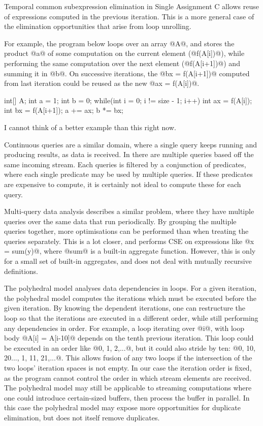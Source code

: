 Temporal common subexpression elimination in Single Assignment C
allows reuse of expressions computed in the previous iteration\cite{imlig2001loop}.
This is a more general case of the elimination opportunities that arise from loop unrolling.

For example, the program below loops over an array @A@, and stores the product @a@ of some computation on the current element (@f(A[i])@), while performing the same computation over the next element (@f(A[i+1])@) and summing it in @b@.
On successive iterations, the @bx = f(A[i+1])@ computed from last iteration could be reused as the new @ax = f(A[i])@.
\begin{code}
int[] A;
int a = 1;
int b = 0;
while(int i = 0; i != size - 1; i++)  {
  int ax = f(A[i]);
  int bx = f(A[i+1]);
  a += ax;
  b *= bx;
}
\end{code}

I cannot think of a better example than this right now.

Continuous queries are a similar domain, where a single query keeps running and producing results, as data is received.
In \cite{munagala2007optimization} there are multiple queries based off the same incoming stream.
Each queries is filtered by a conjunction of predicates, where each single predicate may be used by multiple queries.
If these predicates are expensive to compute, it is certainly not ideal to compute these for each query.

Multi-query data analysis\cite{andrade2003efficient} describes a similar problem, where they have multiple queries over the same data that run periodically.
By grouping the multiple queries together, more optimisations can be performed than when treating the queries separately.
This is a lot closer, and performs CSE on expressions like @x = sum(y)@, where @sum@ is a built-in aggregate function.
However, this is only for a small set of built-in aggregates, and does not deal with mutually recursive definitions.


The polyhedral model\cite{benabderrahmane2010polyhedral} analyses data dependencies in loops.
For a given iteration, the polyhedral model computes the iterations which must be executed before the given iteration.
By knowing the dependent iterations, one can restructure the loop so that the iterations are executed in a different order, while still performing any dependencies in order.
For example, a loop iterating over @i@, with loop body @A[i] = A[i-10]@ depends on the tenth previous iteration.
This loop could be executed in an order like @0, 1, 2,...@, but it could also stride by ten: @0, 10, 20..., 1, 11, 21,...@.
This allows fusion of any two loops if the intersection of the two loops' iteration spaces is not empty.
In our case the iteration order is fixed, as the program cannot control the order in which stream elements are received.
The polyhedral model may still be applicable to streaming computations where one could introduce certain-sized buffers, then process the buffer in parallel.
In this case the polyhedral model may expose more opportunities for duplicate elimination, but does not itself remove duplicates.

